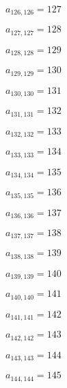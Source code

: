\documentclass[a4paper,12pt]{article}
\begin{document}
$a _{ 126, 126 } = 127$

$a _{ 127, 127 } = 128$

$a _{ 128, 128 } = 129$

$a _{ 129, 129 } = 130$

$a _{ 130, 130 } = 131$

$a _{ 131, 131 } = 132$

$a _{ 132, 132 } = 133$

$a _{ 133, 133 } = 134$

$a _{ 134, 134 } = 135$

$a _{ 135, 135 } = 136$

$a _{ 136, 136 } = 137$

$a _{ 137, 137 } = 138$

$a _{ 138, 138 } = 139$

$a _{ 139, 139 } = 140$

$a _{ 140, 140 } = 141$

$a _{ 141, 141 } = 142$

$a _{ 142, 142 } = 143$

$a _{ 143, 143 } = 144$

$a _{ 144, 144 } = 145$
\end{document}
